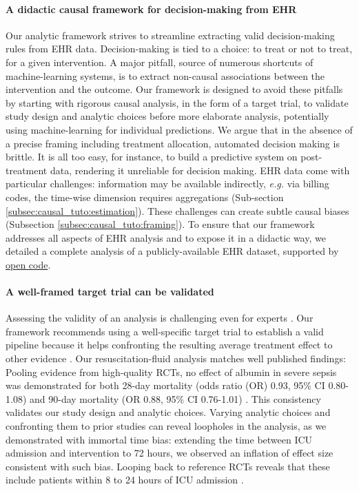 \documentclass[french,12pt,twoside,a4paper]{book}
\begin{document}
\paragraph{A didactic causal framework for decision-making from EHR} Our
analytic framework strives to streamline extracting valid decision-making rules
from EHR data. Decision-making is tied to a choice: to treat or not to treat,
for a given intervention. A major pitfall, source of numerous shortcuts of
machine-learning systems, is to extract non-causal associations between the
intervention and the outcome. Our framework is designed to avoid these pitfalls
by starting with rigorous causal analysis, in the form of a target trial, to
validate study design and analytic choices before more elaborate analysis,
potentially using machine-learning for individual predictions.
%
We argue that in the absence of a precise framing including treatment
allocation, automated decision making is brittle. It is all too easy, for
instance, to build a predictive system on post-treatment data, rendering
it unreliable for decision making.
%
EHR data come with particular challenges: information may be available
indirectly, \emph{e.g.} via billing codes, the time-wise dimension requires
aggregations (Sub-section \ref{subsec:causal_tuto:estimation}). These challenges can create
subtle causal biases (Subsection \ref{subsec:causal_tuto:framing}).
%
To ensure that our framework addresses all aspects of EHR analysis and to
expose it in a didactic way, we detailed a complete analysis of a publicly-available EHR dataset,
supported by \href{https://github.com/soda-inria/causal_ehr_mimic}{open code}.

\paragraph{A well-framed target trial can be validated}

Assessing the validity of an analysis is challenging even for experts
\citep{ioannidis2005most,breznau2022observing}. Our framework recommends
using a well-specific target trial to establish a valid pipeline because
it helps confronting the resulting average treatment effect to other
evidence \citep{hernan_using_2016,wang2023emulation}. Our
resuscitation-fluid analysis matches well published findings:
Pooling evidence from high-quality RCTs, no effect of albumin in severe sepsis
was demonstrated for both 28-day mortality (odds ratio (OR) 0.93, 95\% CI
0.80-1.08) and 90-day mortality (OR 0.88, 95\% CI 0.76-1.01) \citep{xu2014comparison}. This consistency validates
our study design and analytic choices.
Varying analytic choices and confronting them to prior studies can reveal
loopholes in the analysis, as we demonstrated with immortal time bias:
extending the time between ICU admission and intervention to 72 hours,
we observed an inflation of effect size consistent with such
bias. Looping back to reference RCTs reveals that these
include patients within 8
to 24 hours of ICU admission \citep{safe2011impact,annane2013effects,
  caironi2014albumin}.
\end{document}
